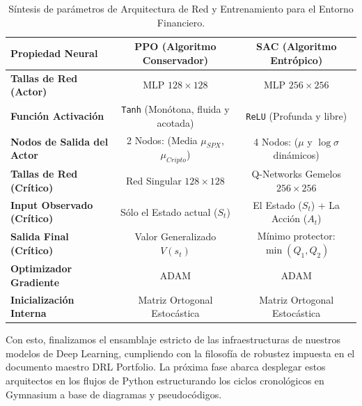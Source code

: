 \documentclass[11pt,a4paper]{article}
\begin{document}
\begin{table}[h!]
    \centering
    \renewcommand{\arraystretch}{1.3} %
    \begin{tabular}{|l|c|c|}
    \hline
    \textbf{Propiedad Neural} & \textbf{PPO (Algoritmo Conservador)} & \textbf{SAC (Algoritmo Entrópico)} \\
    \hline
    \textbf{Tallas de Red (Actor)} & MLP $128 \times 128$ & MLP $256 \times 256$ \\
    \hline
    \textbf{Función Activación} & \texttt{Tanh} (Monótona, fluida y acotada) & \texttt{ReLU} (Profunda y libre) \\
    \hline
    \textbf{Nodos de Salida del Actor} & 2 Nodos: (Media $\mu_{SPX}$, $\mu_{Cripto}$) & 4 Nodos: ($\mu$ y $\log\sigma$ dinámicos) \\
    \hline
    \textbf{Tallas de Red (Crítico)} & Red Singular $128 \times 128$ & Q-Networks Gemelos $256 \times 256$ \\
    \hline
    \textbf{Input Observado (Crítico)} & Sólo el Estado actual ($S_t$) & El Estado ($S_t$) + La Acción ($A_t$) \\
    \hline
    \textbf{Salida Final (Crítico)} & Valor Generalizado $V(s_t)$ & Mínimo protector: $\min(Q_1, Q_2)$ \\
    \hline
    \textbf{Optimizador Gradiente} & ADAM & ADAM \\
    \hline
    \textbf{Inicialización Interna} & Matriz Ortogonal Estocástica & Matriz Ortogonal Estocástica \\
    \hline
    \end{tabular}
    \caption{Síntesis de parámetros de Arquitectura de Red y Entrenamiento para el Entorno Financiero.}
\end{table}

\vspace{5mm}
\noindent Con esto, finalizamos el ensamblaje estricto de las infraestructuras de nuestros modelos de Deep Learning, cumpliendo con la filosofía de robustez impuesta en el documento maestro DRL Portfolio. La próxima fase abarca desplegar estos arquitectos en los flujos de Python estructurando los ciclos cronológicos en Gymnasium a base de diagramas y pseudocódigos.
\end{document}
